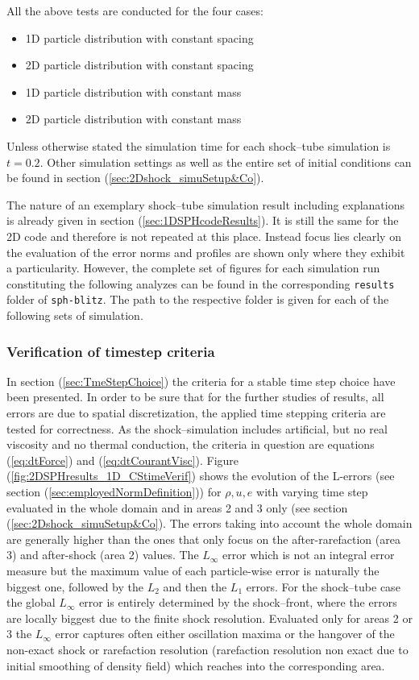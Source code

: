 \documentclass{report}
\begin{document}
All the above tests are conducted for the four cases:
\begin{itemize}
 \item 1D particle distribution with constant spacing
  \item 2D particle distribution with constant spacing
 \item 1D particle distribution with constant mass
  \item 2D particle distribution with constant mass
\end{itemize}

Unless otherwise stated the simulation time for each shock--tube simulation is $t=0.2$. Other simulation settings as well as the entire set of initial conditions can be found in section (\ref{sec:2Dshock_simuSetup&Co}).

The nature of an exemplary shock--tube simulation result including explanations is already given in section (\ref{sec:1DSPHcodeResults}). It is still the same for the 2D code and therefore is not repeated at this place. Instead focus lies clearly on the evaluation of the error norms and profiles are shown only where they exhibit a particularity. However, the complete set of figures for each simulation run constituting the following analyzes can be found in the corresponding {\tt results} folder of {\tt sph-blitz}. The path to the respective folder is given for each of the following sets of simulation.

\subsubsection{Verification of timestep criteria}

In section (\ref{sec:TmeStepChoice}) the criteria for a stable time step choice have been presented. In order to be sure that for the further studies of results, all errors are due to spatial discretization, the applied time stepping criteria are tested for correctness. As the shock--simulation includes artificial, but no real viscosity and no thermal conduction, the criteria in question are equations (\ref{eq:dtForce}) and (\ref{eq:dtCourantVisc}). Figure (\ref{fig:2DSPHresults_1D_CStimeVerif}) shows the evolution of the L-errors (see section (\ref{sec:employedNormDefinition})) for $\rho, u, e$ with varying time step evaluated in the whole domain and in areas 2 and 3 only (see section (\ref{sec:2Dshock_simuSetup&Co}). 
The errors taking into account the whole domain are generally higher than the ones that only focus on the after-rarefaction (area 3) and after-shock (area 2) values. The $L_{\infty}$ error which is not an integral error measure but the maximum value of each particle-wise error is naturally the biggest one, followed by the $L_2$ and then the $L_1$ errors. For the shock--tube case the global $L_{\infty}$ error is entirely determined by the shock--front, where the errors are locally biggest due to the finite shock resolution. Evaluated only for areas 2 or 3 the $L_{\infty}$ error captures often either oscillation maxima or the hangover of the non-exact shock or rarefaction resolution (rarefaction resolution non exact due to initial smoothing of density field) which reaches into the corresponding area.
\end{document}
